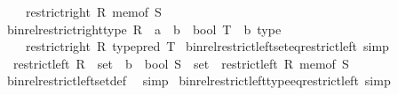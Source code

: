 \begin{isabellebody}
\ \ \ \ restrict{\isacharunderscore}{\kern0pt}right\ R\ {\isacharparenleft}{\kern0pt}mem{\isacharunderscore}{\kern0pt}of\ S{\isacharparenright}{\kern0pt}{\isachardoublequoteclose}\isanewline
\ \ \isamarkupfalse%
\ {\isachardoublequoteopen}bin{\isacharunderscore}{\kern0pt}rel{\isacharunderscore}{\kern0pt}restrict{\isacharunderscore}{\kern0pt}right{\isacharunderscore}{\kern0pt}type\ {\isacharparenleft}{\kern0pt}R\ {\isacharcolon}{\kern0pt}{\isacharcolon}{\kern0pt}\ {\isacharprime}{\kern0pt}a\ {\isasymRightarrow}\ {\isacharprime}{\kern0pt}b\ {\isasymRightarrow}\ bool{\isacharparenright}{\kern0pt}\ {\isacharparenleft}{\kern0pt}T\ {\isacharcolon}{\kern0pt}{\isacharcolon}{\kern0pt}\ {\isacharprime}{\kern0pt}b\ type{\isacharparenright}{\kern0pt}\ {\isasymequiv}\isanewline
\ \ \ \ restrict{\isacharunderscore}{\kern0pt}right\ R\ {\isacharparenleft}{\kern0pt}type{\isacharunderscore}{\kern0pt}pred\ T{\isacharparenright}{\kern0pt}{\isachardoublequoteclose}\isanewline
{}\isamarkupfalse%
\isanewline
\isanewline
{}\isamarkupfalse%
\ bin{\isacharunderscore}{\kern0pt}rel{\isacharunderscore}{\kern0pt}restrict{\isacharunderscore}{\kern0pt}left{\isacharunderscore}{\kern0pt}set{\isacharunderscore}{\kern0pt}eq{\isacharunderscore}{\kern0pt}restrict{\isacharunderscore}{\kern0pt}left\ {\isacharbrackleft}{\kern0pt}simp{\isacharbrackright}{\kern0pt}{\isacharcolon}{\kern0pt}\isanewline
\ \ {\isachardoublequoteopen}restrict{\isacharunderscore}{\kern0pt}left\ {\isacharparenleft}{\kern0pt}R\ {\isacharcolon}{\kern0pt}{\isacharcolon}{\kern0pt}\ set\ {\isasymRightarrow}\ {\isacharprime}{\kern0pt}b\ {\isasymRightarrow}\ bool{\isacharparenright}{\kern0pt}\ {\isacharparenleft}{\kern0pt}S\ {\isacharcolon}{\kern0pt}{\isacharcolon}{\kern0pt}\ set{\isacharparenright}{\kern0pt}\ {\isacharequal}{\kern0pt}\ restrict{\isacharunderscore}{\kern0pt}left\ R\ {\isacharparenleft}{\kern0pt}mem{\isacharunderscore}{\kern0pt}of\ S{\isacharparenright}{\kern0pt}{\isachardoublequoteclose}\isanewline
%
\isadelimproof
\ \ %
\endisadelimproof
%
\isatagproof
{}\isamarkupfalse%
\ bin{\isacharunderscore}{\kern0pt}rel{\isacharunderscore}{\kern0pt}restrict{\isacharunderscore}{\kern0pt}left{\isacharunderscore}{\kern0pt}set{\isacharunderscore}{\kern0pt}def\ \isamarkupfalse%
\ simp%
\endisatagproof
{\isafoldproof}%
%
\isadelimproof
\isanewline
%
\endisadelimproof
\isanewline
{}\isamarkupfalse%
\ bin{\isacharunderscore}{\kern0pt}rel{\isacharunderscore}{\kern0pt}restrict{\isacharunderscore}{\kern0pt}left{\isacharunderscore}{\kern0pt}type{\isacharunderscore}{\kern0pt}eq{\isacharunderscore}{\kern0pt}restrict{\isacharunderscore}{\kern0pt}left\ {\isacharbrackleft}{\kern0pt}simp{\isacharbrackright}{\kern0pt}{\isacharcolon}{\kern0pt}\isanewline

\end{isabellebody}
